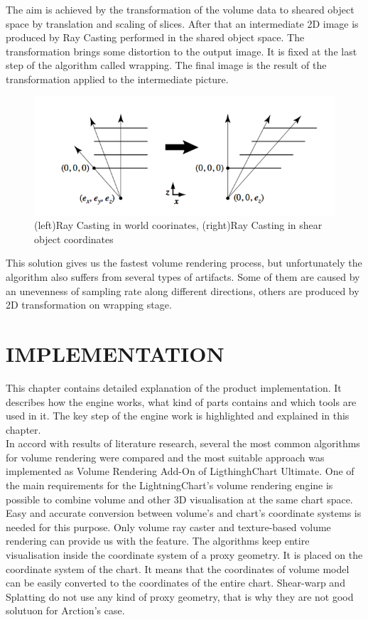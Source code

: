 \documentclass[twoside, english, 11pt]{report}
\begin{document}
The aim is achieved by the transformation of the volume data to sheared object space by translation and scaling of slices. After that an intermediate 2D image is produced by Ray Casting performed in the shared object space. The transformation brings some distortion to the output image. It is fixed at the last step of the algorithm called wrapping. The final image is the result of the transformation applied to the intermediate picture.\\
\begin{figure}[!h]
\centerline{\includegraphics[scale=0.5]{img/shear-warp}}
\caption{(left)Ray Casting in world coorinates, (right)Ray Casting in shear object coordinates}
\end{figure}
This solution gives us the fastest volume rendering process, but unfortunately the algorithm also suffers from several types of artifacts. Some of them are caused by an unevenness of sampling rate along different directions, others are produced by 2D transformation on wrapping stage.

\chapter{IMPLEMENTATION}
This chapter contains detailed explanation of the product implementation. It describes how the engine works, what kind of parts contains and which tools are used in it. The key step of the engine work is highlighted and explained in this chapter.\\

In accord with results of literature research, several the most common algorithms for volume rendering were compared and the most suitable approach was implemented as Volume Rendering Add-On of LigthinghChart Ultimate. One of the main requirements for the LightningChart's volume rendering engine is possible to combine volume and other 3D visualisation at the same chart space. Easy and accurate conversion between volume's and chart's coordinate systems is needed for this  purpose. Only volume ray caster and texture-based volume rendering can provide us with the feature. The algorithms keep entire visualisation inside the coordinate system of a proxy geometry. It is placed on the coordinate system of the chart. It means that the coordinates of volume model can be easily converted to the coordinates of the entire chart. Shear-warp and Splatting do not use any kind of proxy geometry, that is why they are not good solutuon for Arction's case.\\
\end{document}
